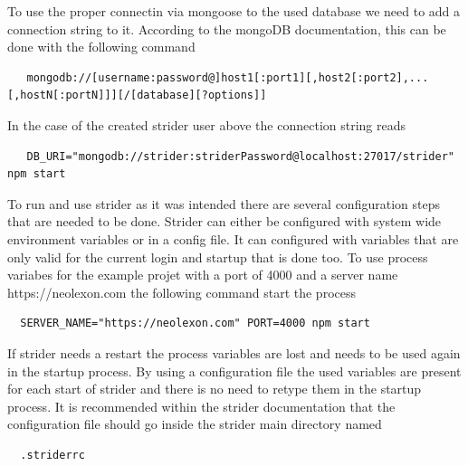 To use the proper connectin via mongoose to the used database we need to add a connection string to it. According to the mongoDB
documentation, this can be done with the following command
\begin{lstlisting}
   mongodb://[username:password@]host1[:port1][,host2[:port2],...[,hostN[:portN]]][/[database][?options]]
\end{lstlisting}
In the case of the created strider user above the connection string reads
\begin{lstlisting}
   DB_URI="mongodb://strider:striderPassword@localhost:27017/strider" npm start
\end{lstlisting}

To run and use strider as it was intended there are several configuration steps that are needed to be done. Strider can either be configured
with system wide environment variables or in a config file. It can configured with variables that are only valid for the current login and
startup that is done too. To use process variabes for the example projet with a port of 4000 and a server name https://neolexon.com the following
command start the process

\begin{lstlisting}
  SERVER_NAME="https://neolexon.com" PORT=4000 npm start
\end{lstlisting}

If strider needs a restart the process variables are lost and needs to be used again in the startup process. By using a configuration file
the used variables are present for each start of strider and there is no need to retype them in the startup process. It is recommended within
the strider documentation that the configuration file should go inside the strider main directory named

\begin{lstlisting}
  .striderrc
\end{lstlisting}

